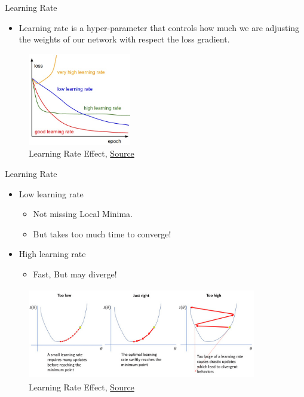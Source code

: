 \begin{frame}{Learning Rate}
	\begin{itemize}
		\item Learning rate is a hyper-parameter that controls how much we are adjusting the weights of our network with respect the loss gradient. 
	\end{itemize}    
	\begin{figure}[H]
		\centering
		\includegraphics[width=0.4\textwidth]{Figs/lr.png}
		\caption{Learning Rate Effect, \href{https://medium.com/iitg-ai/into-the-depths-of-gradient-descent-52cf9ee92d36}{Source}}
	\end{figure}
\end{frame}

\begin{frame}{Learning Rate}
	\begin{itemize}
		\item Low learning rate 
		\begin{itemize}
			\item Not missing Local Minima.
			\item But takes too much time to converge!
		\end{itemize}
		\item High learning rate 
		\begin{itemize}
			\item Fast, But may diverge!
		\end{itemize}
	\end{itemize}  
	\begin{figure}
		\centering
		\includegraphics[width=10cm, height=4cm]{Figs/lr_high_res.jpg}
		\caption{Learning Rate Effect, \href{https://www.jeremyjordan.me/nn-learning-rate/}{Source}}
	\end{figure}
\end{frame}

